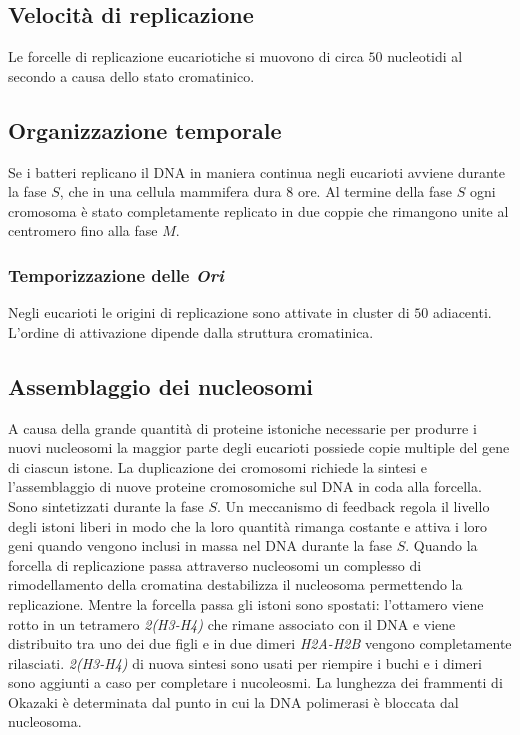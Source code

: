 	\subsection{Velocit\`a di replicazione}
	Le forcelle di replicazione eucariotiche si muovono di circa $50$ nucleotidi al secondo a causa dello stato cromatinico.

	\subsection{Organizzazione temporale}
	Se i batteri replicano il DNA in maniera continua negli eucarioti avviene durante la fase $S$, che in una cellula mammifera dura $8$ ore.
	Al termine della fase $S$ ogni cromosoma \`e stato completamente replicato in due coppie che rimangono unite al centromero fino alla fase $M$.

		\subsubsection{Temporizzazione delle \emph{Ori}}
		Negli eucarioti le origini di replicazione sono attivate in cluster di $50$ adiacenti.
		L'ordine di attivazione dipende dalla struttura cromatinica.

	\subsection{Assemblaggio dei nucleosomi}
	A causa della grande quantit\`a di proteine istoniche necessarie per produrre i nuovi nucleosomi la maggior parte degli eucarioti possiede copie multiple del gene di ciascun istone.
	La duplicazione dei cromosomi richiede la sintesi e l'assemblaggio di nuove proteine cromosomiche sul DNA in coda alla forcella.
	Sono sintetizzati durante la fase $S$.
	Un meccanismo di feedback regola il livello degli istoni liberi in modo che la loro quantit\`a rimanga costante e attiva i loro geni quando vengono inclusi in massa nel DNA durante la fase $S$.
	Quando la forcella di replicazione passa attraverso nucleosomi un complesso di rimodellamento della cromatina destabilizza il nucleosoma permettendo la replicazione.
	Mentre la forcella passa gli istoni sono spostati: l'ottamero viene rotto in un tetramero \emph{2(H3-H4)} che rimane associato con il DNA e viene distribuito tra uno dei due figli e in due dimeri \emph{H2A-H2B} vengono completamente rilasciati.
	\emph{2(H3-H4)} di nuova sintesi sono usati per riempire i buchi e i dimeri sono aggiunti a caso per completare i nucoleosmi.
	La lunghezza dei frammenti di Okazaki \`e determinata dal punto in cui la DNA polimerasi \`e bloccata dal nucleosoma.

